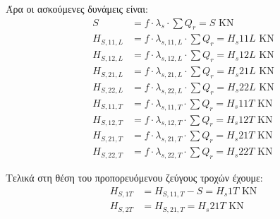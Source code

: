 Άρα οι ασκούμενες δυνάμεις είναι:
\begin{align*}
    S                &= f \cdot \lambda_s \cdot \sum{Q_r} = {{ S }} \text{ KN} \\
    H_{S,11,L}       &= f \cdot \lambda_{s,11,L} \cdot \sum{Q_r} = {{ H_s11L }} \text{ KN} \\
    H_{S,12,L}       &= f \cdot \lambda_{s,12,L} \cdot \sum{Q_r} = {{ H_s12L }} \text{ KN} \\
    H_{S,21,L}       &= f \cdot \lambda_{s,21,L} \cdot \sum{Q_r} = {{ H_s21L }} \text{ KN} \\
    H_{S,22,L}       &= f \cdot \lambda_{s,22,L} \cdot \sum{Q_r} = {{ H_s22L }} \text{ KN} \\
    H_{S,11,T}       &= f \cdot \lambda_{s,11,T} \cdot \sum{Q_r} = {{ H_s11T }} \text{ KN} \\
    H_{S,12,T}       &= f \cdot \lambda_{s,12,T} \cdot \sum{Q_r} = {{ H_s12T }} \text{ KN} \\
    H_{S,21,T}       &= f \cdot \lambda_{s,21,T} \cdot \sum{Q_r} = {{ H_s21T }} \text{ KN} \\
    H_{S,22,T}       &= f \cdot \lambda_{s,22,T} \cdot \sum{Q_r} = {{ H_s22T }} \text{ KN}
\end{align*}

Τελικά στη θέση του προπορευόμενου ζεύγους τροχών έχουμε:
\begin{align*}
    H_{S,1T} &= H_{S,11,T} - S = {{ H_s1T }} \text{ KN} \\
    H_{S,2T} &= H_{S,21,T} = {{ H_s21T }} \text{ KN}
\end{align*}
